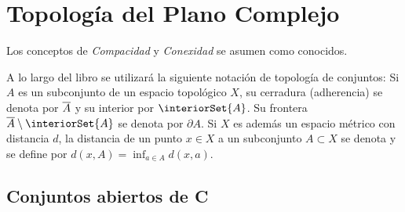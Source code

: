 \section{Topología del Plano Complejo}
Los conceptos de {\it Compacidad} y {\it Conexidad} se asumen como conocidos. 

A lo largo del libro se utilizará la siguiente notación de topología de conjuntos: 
Si $A$ es un subconjunto de un espacio topológico $X$, su cerradura (adherencia) 
se denota por $\overline{A}$ y su interior por $\interiorSet{A}$. Su frontera 
$\closureSet{A} \setminus \interiorSet{A}$ se denota por $\partial A$. Si $X$ es además 
un espacio métrico con distancia $d$, la distancia de un punto $x \in X$ a un 
subconjunto $A\subset X$ se denota y se define por $d(x, A) = \displaystyle \inf_{a \in A} d(x,a)$.

\subsection{Conjuntos abiertos de C}

